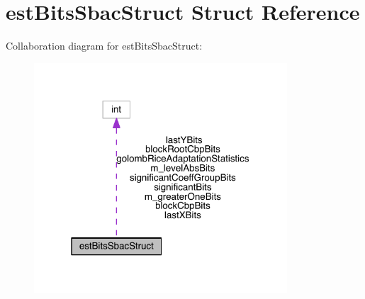 \hypertarget{structest_bits_sbac_struct}{}\section{est\+Bits\+Sbac\+Struct Struct Reference}
\label{structest_bits_sbac_struct}


Collaboration diagram for est\+Bits\+Sbac\+Struct\+:
\nopagebreak
\begin{figure}[H]
\begin{center}
\leavevmode
\includegraphics[width=268pt]{d4/d86/structest_bits_sbac_struct__coll__graph}
\end{center}
\end{figure}
